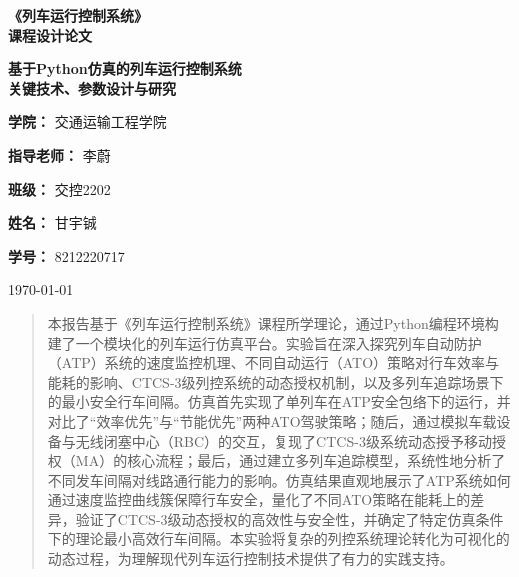 \documentclass[11pt, a4paper]{ctexart}
\begin{document}
\begin{titlepage}
    \centering
    \vspace*{3cm} %
    
    \Huge \textbf{《列车运行控制系统》\\ [0.5em]课程设计论文}
    
    \vspace{2cm} %
    
    {\Huge \bfseries 基于Python仿真的列车运行控制系统\\[0.5em]关键技术、参数设计与研究\par}
    
    \vspace{3cm} %
    
    \Large \textbf{学院：} 交通运输工程学院
    
    \vspace{0.5cm}
    
    \Large \textbf{指导老师：} 李蔚
    
    \vspace{0.5cm}
    
    \Large \textbf{班级：} 交控2202
    
    \vspace{0.5cm}
    
    \Large \textbf{姓名：} 甘宇铖
    
    \vspace{0.5cm}
    
    \Large \textbf{学号：} 8212220717
    
    \vfill %
    
    {\large \today}
\end{titlepage}
\newpage

\begin{abstract}
    \noindent\kaishu
    本报告基于《列车运行控制系统》课程所学理论，通过Python编程环境构建了一个模块化的列车运行仿真平台。实验旨在深入探究列车自动防护（ATP）系统的速度监控机理、不同自动运行（ATO）策略对行车效率与能耗的影响、CTCS-3级列控系统的动态授权机制，以及多列车追踪场景下的最小安全行车间隔。仿真首先实现了单列车在ATP安全包络下的运行，并对比了“效率优先”与“节能优先”两种ATO驾驶策略；随后，通过模拟车载设备与无线闭塞中心（RBC）的交互，复现了CTCS-3级系统动态授予移动授权（MA）的核心流程；最后，通过建立多列车追踪模型，系统性地分析了不同发车间隔对线路通行能力的影响。仿真结果直观地展示了ATP系统如何通过速度监控曲线簇保障行车安全，量化了不同ATO策略在能耗上的差异，验证了CTCS-3级动态授权的高效性与安全性，并确定了特定仿真条件下的理论最小高效行车间隔。本实验将复杂的列控系统理论转化为可视化的动态过程，为理解现代列车运行控制技术提供了有力的实践支持。
\end{abstract}
\end{document}
